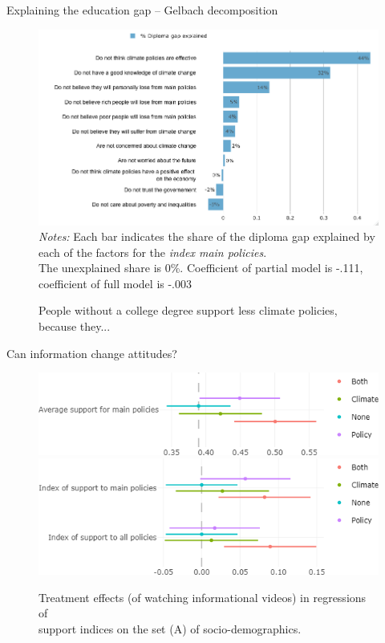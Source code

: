 \begin{framefont}{\small}
\begin{frame}{Explaining the education gap -- Gelbach decomposition}%

\begin{figure}[h!]
\caption{People without a college degree support less climate policies, because they...}
\includegraphics[width=.65\textwidth]{../figures/FR/gelbach_college_no_fairness_index_main_policies} \\
{\tiny \textit{Notes:} Each bar indicates the share of the diploma gap explained by each of the factors for the \textit{index main policies}.\\ The unexplained share is 0\%. Coefficient of partial model is -.111, coefficient of full model is -.003}
\end{figure}
\end{frame}

\begin{frame}{Can information change attitudes?}
\begin{figure}
	\caption{Treatment effects (of watching informational videos) in regressions of \\support indices on the set (A) of socio-demographics.}
	\includegraphics[width=.7\textwidth]{../figures/FR/policies_support_by_treatment.png}
	\includegraphics[width=.7\textwidth]{../figures/FR/indices_policies_by_treatment_origin0.png}
\end{figure}
\end{frame}


\end{framefont}
